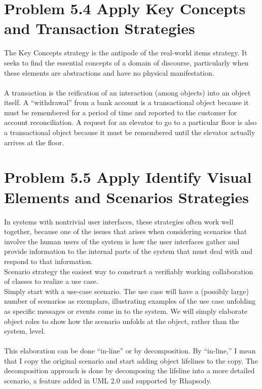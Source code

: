 \documentclass[12pt,a4paper]{article}
\begin{document}
\section{Problem 5.4 Apply Key Concepts and Transaction Strategies}
The Key Concepts strategy is the antipode of the real-world items strategy. It seeks
to find the essential concepts of a domain of discourse, particularly when these elements are abstractions and have no physical manifestation. \\ \\

A transaction is the reification of an interaction (among objects) into an object
itself. A “withdrawal” from a bank account is a transactional object because it must be remembered for a period of time and reported to the customer for account reconciliation. A request for an elevator to go to a particular floor is also a transactional object because it must be remembered until the elevator actually arrives at the floor.

\section{Problem 5.5 Apply Identify Visual Elements and Scenarios Strategies}
In systems with nontrivial user interfaces, these strategies often
work well together, because one of the issues that arises when considering scenarios that involve the human users of the system is how the user interfaces gather and provide information to the internal parts of the system that must deal with and respond to that information. \\
Scenario strategy the easiest way to construct a verifiably working
collaboration of classes to realize a use case. \\ Simply start with a use-case scenario. The use case will have a (possibly large) number
of scenarios as exemplars, illustrating examples of the use case unfolding as specific messages or events come in to the system. We will simply
elaborate object roles to show how the scenario unfolds at the object, rather than the
system, level. \\ \\
This elaboration can be done “in-line” or by decomposition. By “in-line,” I mean
that I copy the original scenario and start adding object lifelines to the copy. The
decomposition approach is done by decomposing the lifeline into a more detailed
scenario, a feature added in UML 2.0 and supported by Rhapsody. \\
\end{document}
